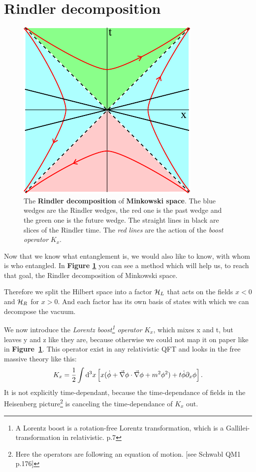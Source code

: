 \section{Rindler decomposition}
\FloatBarrier
		\begin{figure}[tbp]
			\begin{center}
				\includegraphics[scale=1]{boost}
				\caption{The \textbf{Rindler decomposition} of \textbf{Minkowski space}. The blue wedges are the Rindler wedges, the red one is the past wedge and the green one is the future wedge. The straight lines in black are slices of the Rindler time. The \textit{red lines} are the action of the \textit{boost operator} $K_x$.}\label{Rindler}
			\end{center}
		\end{figure}
	Now that we know  what entanglement is, we would also like to know, with whom is who entangled. In \textbf{Figure \ref{Rindler}} you can see a method which will help us, to reach that goal, the Rindler decomposition of Minkowski space.
	
	Therefore we split the Hilbert space into a factor $\mathcal{H}_L$ that acts on the fields $x<0$ and $\mathcal{H}_R$ for $x>0$. And each factor has its own basis of states with which we can decompose the vacuum. 
	
	We now introduce the \textit{Lorentz boost\footnote{A Lorentz boost is a rotation-free Lorentz transformation, which is a Gallilei-transformation in relativistic.\cite{ARTfliesbach} p.7} operator} $K_x$, which mixes x and t, but leaves y and z like they are, because otherwise we could not map it on paper like in \textbf{Figure~\ref{Rindler}}. This operator exist in any relativistic QFT and looks in the free massive theory like this:
	\begin{equation}
		K_x = \frac{1}{2} \int \mathrm{d}^3 x 
		\left[ x (\dot{\phi} + \vec{\nabla} \phi \cdot \vec{\nabla} \phi + m^2 \phi^2) + t\dot{\phi} \partial_x \phi
		\right].
	\end{equation}
	It is not explicitly time-dependant, because the time-dependance of fields in the Heisenberg picture\footnote{Here the operators are following an equation of motion. [see Schwabl QM1 p.176]} is canceling the time-dependance of $K_x$ out. 
	

